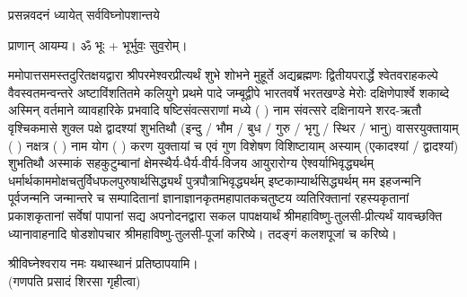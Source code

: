 
\setlength{\parindent}{0pt}




{प्रसन्नवदनं ध्यायेत् सर्वविघ्नोपशान्तये}
 
प्राणान्  आयम्य।  ॐ भूः + भूर्भुवः॒ सुव॒रोम्।


ममोपात्तसमस्तदुरितक्षयद्वारा श्रीपरमेश्वरप्रीत्यर्थं शुभे शोभने मुहूर्ते अद्यब्रह्मणः
द्वितीयपरार्द्धे श्वेतवराहकल्पे वैवस्वतमन्वन्तरे अष्टाविंशतितमे कलियुगे प्रथमे पादे
जम्बूद्वीपे भारतवर्षे भरतखण्डे मेरोः दक्षिणेपार्श्वे शकाब्दे अस्मिन् वर्तमाने व्यावहारिके
 प्रभवादि षष्टिसंवत्सराणां मध्ये (  ) नाम संवत्सरे दक्षिनायने
शरद-ऋतौ  वृश्चिकमासे शुक्ल पक्षे द्वादश्यां शुभतिथौ
(इन्दु / भौम / बुध / गुरु / भृगु / स्थिर / भानु) वासरयुक्तायाम्
(  ) नक्षत्र (  ) नाम  योग  (  ) करण युक्तायां च एवं गुण विशेषण विशिष्टायाम्
अस्याम् (एकादश्यां / द्वादश्यां) शुभतिथौ
अस्माकं सहकुटुम्बानां क्षेमस्थैर्य-धैर्य-वीर्य-विजय आयुरारोग्य ऐश्वर्याभिवृद्ध्यर्थम्
 धर्मार्थकाममोक्ष\-चतुर्विधफलपुरुषार्थसिद्ध्यर्थं पुत्रपौत्राभि\-वृद्ध्यर्थम् इष्टकाम्यार्थसिद्ध्यर्थम्
मम इहजन्मनि पूर्वजन्मनि जन्मान्तरे च सम्पादितानां ज्ञानाज्ञानकृतमहा\-पातकचतुष्टय
व्यतिरिक्तानां रहस्यकृतानां प्रकाशकृतानां सर्वेषां पापानां सद्य अपनोदनद्वारा सकल
पापक्षयार्थं श्रीमहाविष्णु-तुलसी-प्रीत्यर्थं यावच्छक्ति ध्यानावाहनादि
षोडशोपचार श्रीमहाविष्णु-तुलसी-पूजां करिष्ये। तदङ्गं कलशपूजां च करिष्ये।


श्रीविघ्नेश्वराय नमः यथास्थानं प्रतिष्ठापयामि।\\
(गणपति प्रसादं शिरसा गृहीत्वा)













